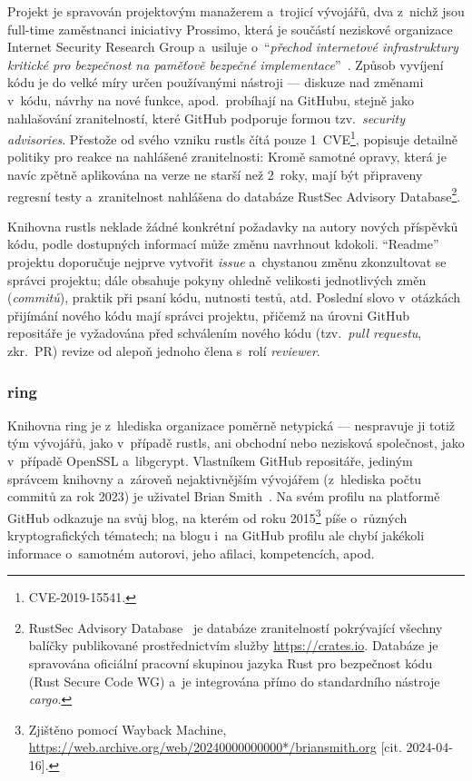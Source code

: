 Projekt je spravován projektovým manažerem a~trojicí vývojářů, dva z~nichž jsou full-time zaměstnanci iniciativy Prossimo, která je součástí neziskové organizace Internet Security Research Group a~usiluje o~``\textit{přechod internetové infrastruktury kritické pro bezpečnost na paměťově bezpečné implementace}''~\cite{prossimo}. Způsob vyvíjení kódu je do velké míry určen používanými nástroji --- diskuze nad změnami v~kódu, návrhy na nové funkce, apod.\ probíhají na GitHubu, stejně jako nahlašování zranitelností, které GitHub podporuje formou tzv.~\textit{security advisories}. Přestože od svého vzniku rustls čítá pouze 1~CVE\footnote{CVE-2019-15541.}, popisuje detailně politiky pro reakce na nahlášené zranitelnosti: Kromě samotné opravy, která je navíc zpětně aplikována na verze ne starší než 2~roky, mají být připraveny regresní testy a~zranitelnost nahlášena do databáze RustSec Advisory Database\footnote{RustSec Advisory Database~\cite{rustsec} je databáze zranitelností pokrývající všechny balíčky publikované pro\-střed\-nic\-tvím služby \url{https://crates.io}. Databáze je spravována oficiální pracovní skupinou jazyka Rust pro bezpečnost kódu (Rust Secure Code WG) a~je integrována přímo do standardního nástroje \textit{cargo}.}.

Knihovna rustls neklade žádné konkrétní požadavky na autory nových příspěvků kódu, podle dostupných informací může změnu navrhnout kdokoli. ``Readme'' projektu doporučuje nejprve vytvořit \textit{issue} a~chystanou změnu zkonzultovat se správci projektu; dále obsahuje pokyny ohledně velikosti jednotlivých změn (\textit{commitů}), praktik při psaní kódu, nutnosti testů, atd. Poslední slovo v~otázkách přijímání nového kódu mají správci projektu, přičemž na úrovni GitHub repositáře je vyžadována před schválením nového kódu (tzv.~\textit{pull requestu}, zkr.~PR) revize od alepoň jednoho člena s~rolí \textit{reviewer}.~\cite{rustls-gh}

\subsubsection*{ring}

Knihovna ring je z~hlediska organizace poměrně netypická --- nespravuje ji totiž tým vývojářů, jako v~případě rustls, ani obchodní nebo nezisková společnost, jako v~případě OpenSSL a~libgcrypt. Vlastníkem GitHub repositáře, jediným správcem knihovny a~zároveň nejaktivnějším vývojářem (z~hlediska počtu commitů za rok 2023) je uživatel Brian Smith~\cite{ringgithub}. Na svém profilu na platformě GitHub odkazuje na svůj blog, na kterém od roku 2015\footnote{Zjištěno pomocí Wayback Machine, \url{https://web.archive.org/web/20240000000000*/briansmith.org} [cit. 2024-04-16].} píše o~různých kryptografických tématech; na blogu i~na GitHub profilu ale chybí jakékoli informace o~samotném autorovi, jeho afilaci, kompetencích, apod.

